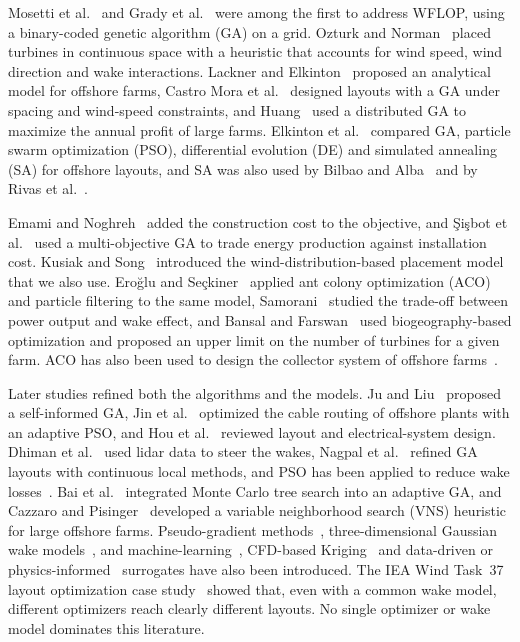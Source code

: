 \documentclass[journal,twoside]{IEEEtran}
\begin{document}
Mosetti et al.~\cite{Mosetti1994} and Grady et al.~\cite{Grady2005} were among the first to address WFLOP, using a binary-coded genetic algorithm (GA) on a grid. Ozturk and Norman~\cite{Ozturk2004} placed turbines in continuous space with a heuristic that accounts for wind speed, wind direction and wake interactions. Lackner and Elkinton~\cite{Lackner2007} proposed an analytical model for offshore farms, Castro Mora et al.~\cite{Mora2007} designed layouts with a GA under spacing and wind-speed constraints, and Huang~\cite{Huang2007} used a distributed GA to maximize the annual profit of large farms. Elkinton et al.~\cite{Elkinton2008} compared GA, particle swarm optimization (PSO), differential evolution (DE) and simulated annealing (SA) for offshore layouts, and SA was also used by Bilbao and Alba~\cite{Bilbao2009} and by Rivas et al.~\cite{Rivas2009}.

Emami and Noghreh~\cite{Emami2010} added the construction cost to the objective, and \c{S}i\c{s}bot et al.~\cite{Sisbot2010} used a multi-objective GA to trade energy production against installation cost. Kusiak and Song~\cite{Kusiak2010} introduced the wind-distribution-based placement model that we also use. Ero\u{g}lu and Se\c{c}kiner~\cite{Eroglu2012,Eroglu2013} applied ant colony optimization (ACO) and particle filtering to the same model, Samorani~\cite{Samorani2013} studied the trade-off between power output and wake effect, and Bansal and Farswan~\cite{Bansal2017} used biogeography-based optimization and proposed an upper limit on the number of turbines for a given farm. ACO has also been used to design the collector system of offshore farms~\cite{Srikakulapu2018}.

Later studies refined both the algorithms and the models. Ju and Liu~\cite{Ju2019} proposed a self-informed GA, Jin et al.~\cite{Jin2019} optimized the cable routing of offshore plants with an adaptive PSO, and Hou et al.~\cite{Hou2019} reviewed layout and electrical-system design. Dhiman et al.~\cite{Dhiman2020} used lidar data to steer the wakes, Nagpal et al.~\cite{Nagpal2021} refined GA layouts with continuous local methods, and PSO has been applied to reduce wake losses~\cite{Asaah2021}. Bai et al.~\cite{Bai2022} integrated Monte Carlo tree search into an adaptive GA, and Cazzaro and Pisinger~\cite{Cazzaro2022} developed a variable neighborhood search (VNS) heuristic for large offshore farms. Pseudo-gradient methods~\cite{Quaeghebeur2021}, three-dimensional Gaussian wake models~\cite{Tao2020}, and machine-learning~\cite{Yang2023}, CFD-based Kriging~\cite{Wang2024} and data-driven or physics-informed~\cite{Yang2024,Li2025} surrogates have also been introduced. The IEA Wind Task~37 layout optimization case study~\cite{Baker2019} showed that, even with a common wake model, different optimizers reach clearly different layouts. No single optimizer or wake model dominates this literature.
\end{document}
